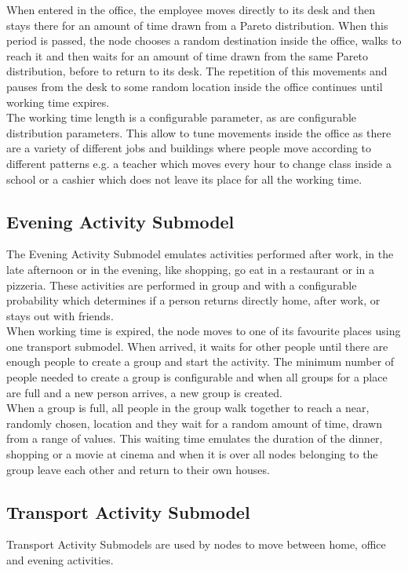 When entered in the office, the employee moves directly to its desk and then stays there for an amount of time drawn from a Pareto distribution. When this period is passed, the node chooses a random destination inside the office, walks to reach it and then waits for an amount of time drawn from the same Pareto distribution, before to return to its desk. The repetition of this movements and pauses from the desk to some random location inside the office continues until working time expires. 
\\

The working time length is a configurable parameter, as are configurable distribution parameters. This allow to tune movements inside the office as there are a variety of different jobs and buildings where people move according to different patterns e.g. a teacher which moves every hour to change class inside a school or a cashier which does not leave its place for all the working time.


\subsection{Evening Activity Submodel}
The Evening Activity Submodel emulates activities performed after work, in the late afternoon or in the evening, like shopping, go eat in a restaurant or in a pizzeria. These activities are performed in group and with a configurable probability which determines if a person returns directly home, after work, or stays out with friends.
\\

When working time is expired, the node moves to one of its favourite places using one transport submodel. When arrived, it waits for other people until there are enough people to create a group and start the activity. The minimum number of people needed to create a group is configurable and when all groups for a place are full and a new person arrives, a new group is created.
\\

When a group is full, all people in the group walk together to reach a near, randomly chosen, location and they wait for a random amount of time, drawn from a range of values. This waiting time emulates the duration of the dinner, shopping or a movie at cinema and when it is over all nodes belonging to the group leave each other and return to their own houses.

\subsection{Transport Activity Submodel}
Transport Activity Submodels are used by nodes to move between home, office and evening activities.
\\

